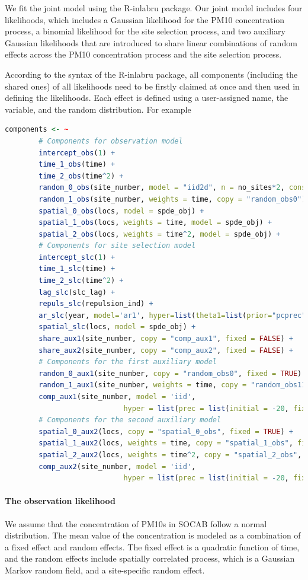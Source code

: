 We fit the joint model using the R-inlabru package. Our joint model includes four likelihoods, which
includes a Gaussian likelihood for the PM10 concentration process, a binomial likelihood for the
site selection process, and two auxiliary Gaussian likelihoods that are introduced to share linear
combinations of random effects across the PM10 concentration process and the site selection process.

According to the syntax of the R-inlabru package, all components (including the shared ones) of all
likelihoods need to be firstly claimed at once and then used in defining the likelihoods. Each 
effect is defined using a user-assigned name, the variable, and the random distribution. For example


\begin{lstlisting}[language = R]
	components <- ~ 
		# Components for observation model
		intercept_obs(1) +   
		time_1_obs(time) +  
		time_2_obs(time^2) +  
		random_0_obs(site_number, model = "iid2d", n = no_sites*2, constr=TRUE) +  
		random_1_obs(site_number, weights = time, copy = "random_obs0") +  
		spatial_0_obs(locs, model = spde_obj) +  
		spatial_1_obs(locs, weights = time, model = spde_obj) +  
		spatial_2_obs(locs, weights = time^2, model = spde_obj) +    
		# Components for site selection model  
		intercept_slc(1) + 
		time_1_slc(time) +  
		time_2_slc(time^2) +  
		lag_slc(slc_lag) +  
		repuls_slc(repulsion_ind) + 
		ar_slc(year, model='ar1', hyper=list(theta1=list(prior="pcprec",param=c(2, 0.01)))) +  
		spatial_slc(locs, model = spde_obj) +  
		share_aux1(site_number, copy = "comp_aux1", fixed = FALSE) +   
		share_aux2(site_number, copy = "comp_aux2", fixed = FALSE) +    
		# Components for the first auxiliary model  
		random_0_aux1(site_number, copy = "random_obs0", fixed = TRUE) +  
		random_1_aux1(site_number, weights = time, copy = "random_obs11", fixed = TRUE) +  
		comp_aux1(site_number, model = 'iid', 
							hyper = list(prec = list(initial = -20, fixed=TRUE))) +    
		# Components for the second auxiliary model  
		spatial_0_aux2(locs, copy = "spatial_0_obs", fixed = TRUE) +  
		spatial_1_aux2(locs, weights = time, copy = "spatial_1_obs", fixed = TRUE) +  
		spatial_2_aux2(locs, weights = time^2, copy = "spatial_2_obs", fixed = TRUE) +  
		comp_aux2(site_number, model = 'iid', 
							hyper = list(prec = list(initial = -20, fixed=TRUE)))
\end{lstlisting} \label{code:inlabru_components}
\paragraph{The observation likelihood}
We assume that the concentration of PM10s in SOCAB follow a normal distribution. The mean value of 
the concentration is modeled as a combination of a fixed effect and random effects. The fixed 
effect is a quadratic function of time, and the random effects include spatially correlated process,
which is a Gaussian Markov random field, and a site-specific random effect.  

